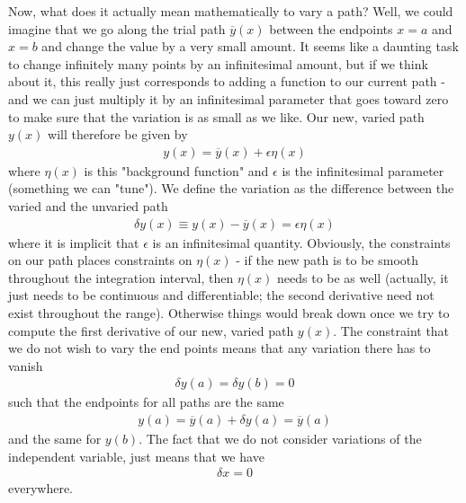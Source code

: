 \documentclass[a4paper]{article}
\begin{document}
    Now, what does it actually mean mathematically to vary a path? Well, we could imagine that we go along the trial path \(\overline{y}(x)\) between the endpoints \(x = a\) and \(x = b\) and change the value by a very small amount. It seems like a daunting task to change infinitely many points by an infinitesimal amount, but if we think about it, this really just corresponds to adding a function to our current path - and we can just multiply it by an infinitesimal parameter that goes toward zero to make sure that the variation is as small as we like. Our new, varied path \(y(x)\) will therefore be given by
    \begin{align*}
        y(x) = \overline{y}(x) + \epsilon \eta (x)
    \end{align*}
    where \(\eta(x)\) is this "background function" and \(\epsilon\) is the infinitesimal parameter (something we can "tune"). We define the variation as the difference between the varied and the unvaried path
     \begin{align*}
        \delta y(x) \equiv y(x) - \overline{y}(x) = \epsilon \eta (x)
    \end{align*}
    where it is implicit that \(\epsilon\) is an infinitesimal quantity. Obviously, the constraints on our path places constraints on \(\eta (x)\) - if the new path is to be smooth throughout the integration interval, then \(\eta (x)\) needs to be as well (actually, it just needs to be continuous and differentiable; the second derivative need not exist throughout the range). Otherwise things would break down once we try to compute the first derivative of our new, varied path \(y(x)\). The constraint that we do not wish to vary the end points means that any variation there has to vanish \begin{align*}
        \delta y(a) = \delta y(b) = 0
    \end{align*} 
    such that the endpoints for all paths are the same \begin{align*}
        y(a) = \overline{y}(a) + \delta y(a) = \overline{y}(a)
    \end{align*}
    and the same for \(y(b)\). The fact that we do not consider variations of the independent variable, just means that we have \begin{align*}
        \delta x = 0
    \end{align*}
    everywhere.
    
\end{document}
